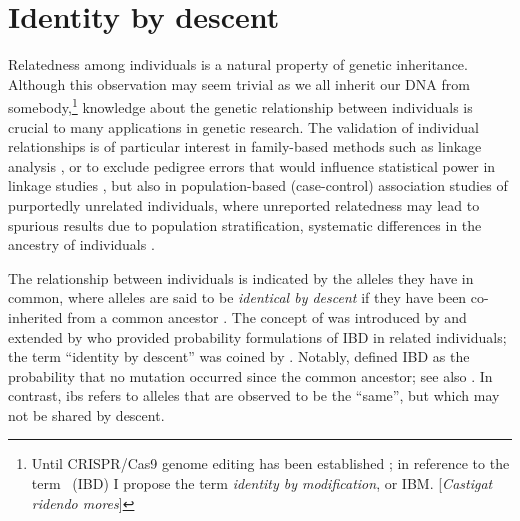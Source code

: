 
%
\section{Identity by descent}
%

Relatedness among individuals is a natural property of genetic inheritance.
Although this observation may seem trivial as we all inherit our DNA from somebody,\footnote{Until CRISPR/Cas9 genome editing has been established \citep[\eg see][]{Cai:2016km}; in reference to the term \emph{}~(IBD) I propose the term \emph{identity by modification}, or IBM. {\color{oxgray}[\textit{Castigat ridendo mores}]}} knowledge about the genetic relationship between individuals is crucial to many applications in genetic research.
The validation of individual relationships is of particular interest in family-based methods such as linkage analysis \citep{Purcell:2007dg,Albrechtsen:2009cb}, or to exclude pedigree errors that would influence statistical power in linkage studies \citep{Boehnke:1997ku}, but also in population-based (case-control) association studies of purportedly unrelated individuals, where unreported relatedness may lead to spurious results due to population stratification, \ie systematic differences in the ancestry of individuals \citep{Freedman:2004dk,Voight:2005cr}.

The relationship between individuals is indicated by the alleles they have in common, where  alleles are said to be \emph{identical by descent} if they have been co-inherited from a common ancestor \citep{Thompson:1974fi,Thompson:1975uu}.
The concept of  was introduced by \citet{cotterman1940calculus} and extended by \citet{malecot1948mathematics} who provided probability formulations of IBD in related individuals; the term ``identity by descent'' was coined by \citet{crow1954}.
Notably, \citet{malecot1948mathematics} defined IBD as the probability that no mutation occurred since the common ancestor; see also \citet{Slatkin:2008by}.
In contrast, \gls{ibs} refers to alleles that are observed to be the ``same'', but which may not be shared by descent.

